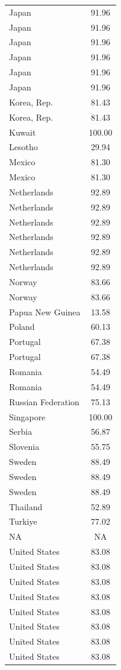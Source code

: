\documentclass[
]{article}
\begin{document}
\begin{center}
\begin{ThreePartTable}
\begin{longtable}{lc}
Japan & 91.96\\
Japan & 91.96\\
Japan & 91.96\\
Japan & 91.96\\
Japan & 91.96\\
Japan & 91.96\\
Korea, Rep. & 81.43\\
Korea, Rep. & 81.43\\
Kuwait & 100.00\\
Lesotho & 29.94\\
Mexico & 81.30\\
Mexico & 81.30\\
Netherlands & 92.89\\
Netherlands & 92.89\\
Netherlands & 92.89\\
Netherlands & 92.89\\
Netherlands & 92.89\\
Netherlands & 92.89\\
Norway & 83.66\\
Norway & 83.66\\
Papua New Guinea & 13.58\\
Poland & 60.13\\
Portugal & 67.38\\
Portugal & 67.38\\
Romania & 54.49\\
Romania & 54.49\\
Russian Federation & 75.13\\
Singapore & 100.00\\
Serbia & 56.87\\
Slovenia & 55.75\\
Sweden & 88.49\\
Sweden & 88.49\\
Sweden & 88.49\\
Thailand & 52.89\\
Turkiye & 77.02\\
NA & NA\\
United States & 83.08\\
United States & 83.08\\
United States & 83.08\\
United States & 83.08\\
United States & 83.08\\
United States & 83.08\\
United States & 83.08\\
United States & 83.08\\

\end{longtable}
\end{ThreePartTable}
\end{center}
\end{document}
